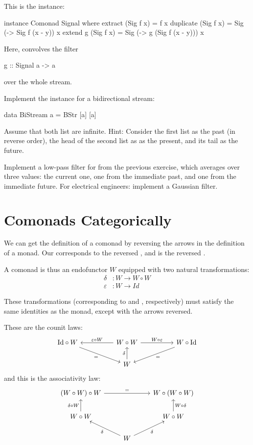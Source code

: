 \documentclass[DaoFP]{subfiles}
\begin{document}
This is the  instance:
\begin{haskell}
instance Comonad Signal where
  extract (Sig f x) = f x
  duplicate (Sig f x) = Sig (\y -> Sig f (x - y)) x
  extend g (Sig f x) = Sig (\y -> g (Sig f (x - y))) x
\end{haskell}
Here,  convolves the filter 
\begin{haskell}
g :: Signal a -> a
\end{haskell}
over the whole stream. 

\begin{exercise}
Implement the  instance for a bidirectional stream:
\begin{haskell}
data BiStream a = BStr [a] [a]
\end{haskell}
Assume that both list are infinite. Hint: Consider the first list as the past (in reverse order), the head of the second list as as the present, and its tail as the future.
\end{exercise}

\begin{exercise}
Implement a low-pass filter for  from the previous exercise, which averages over three values: the current one, one from the immediate past, and one from the immediate future. For electrical engineers: implement a Gaussian filter. 
\end{exercise}

\section{Comonads Categorically}

We can get the definition of a comonad by reversing the arrows in the definition of a monad. Our  corresponds to the reversed , and  is the reversed . 


A comonad is thus an endofunctor $W$ equipped with two natural transformations:
\begin{align*}
\delta &\colon W \to W \circ W \\
\varepsilon &\colon W \to \mathit{Id} 
\end{align*}

These transformations (corresponding to  and , respectively) must satisfy the same identities as the monad, except with the arrows reversed. 

These are the counit laws:
\[
 \begin{tikzcd}
\text{Id} \circ W
 \arrow[rrd, "="']
& & W \circ W
 \arrow[ll, "\varepsilon \circ W"']
 \arrow[rr, "W \circ \varepsilon"]
&& W \circ \text{Id}
 \arrow[lld, "="]
 \\
 && W
  \arrow[u, "\delta"]
 \end{tikzcd}
\]
and this is the associativity law:
\[
 \begin{tikzcd}
 (W \circ W) \circ W 
 \arrow[rr, "="]
 &&
 W \circ (W \circ W)
 \\
 W \circ W 
 \arrow[u, "\delta \circ W"]
& & W \circ W
 \arrow[u, "W \circ \delta"']
 \\
&  W
 \arrow[ul, "\delta"]
 \arrow[ur, "\delta"']
 \end{tikzcd}
\]
\end{document}
